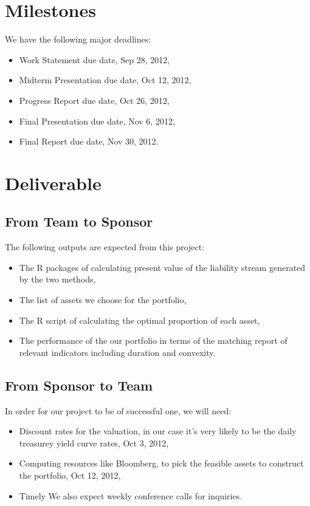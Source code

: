 \documentclass[12pt,letterpaper]{article}
\theoremstyle{definition}
\begin{document}
\section{Milestones}
We have the following major deadlines:
\begin{itemize}
    \item Work Statement due date, Sep 28, 2012,
    \item Midterm Presentation due date, Oct 12, 2012,
    \item Progress Report due date, Oct 26, 2012,
    \item Final Presentation due date, Nov 6, 2012,
    \item Final Report due date, Nov 30, 2012.
\end{itemize}


\section{Deliverable}
\subsection{From Team to Sponsor} %
The following outputs are expected from this project:
\begin{itemize}
    \item The R packages of calculating present value of the liability stream generated by the two methods,
    \item The list of assets we choose for the portfolio,
    \item The R script of calculating the optimal proportion of each asset,
    \item The performance of the our portfolio in terms of the matching report of relevant indicators including duration and convexity.
\end{itemize}

\subsection{From Sponsor to Team} %

In order for our project to be of successful one, we will need:
\begin{itemize}
    \item Discount rates for the valuation, in our case it's very likely to be the daily treasurey yield curve rates,  Oct 3, 2012,
    \item Computing resources like Bloomberg, to pick the feasible assets to construct the portfolio, Oct 12, 2012,
    \item Timely We also expect weekly conference calls for inquiries.
\end{itemize}
\end{document}
